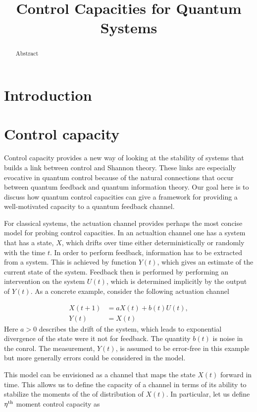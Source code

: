\documentclass[superscriptaddress,aps,pra,nofootinbib,onecolumn,notitlepage,10pt]{revtex4-1}
\begin{document}
\title{Control Capacities for Quantum Systems}
\begin{abstract}
Abstract
\end{abstract}
\maketitle
\section{Introduction}
\section{Control capacity}
Control capacity provides a new way of looking at the stability of systems that builds a link between control and Shannon theory.  These links are especially evocative in quantum control because of the natural connections that occur between quantum feedback and quantum information theory.  Our goal here is to discuss how quantum control capacities can give a framework for providing a well-motivated capacity to a quantum feedback channel.

For classical systems, the actuation channel provides perhaps the most concise model for probing control capacities.  In an actualtion channel one has a system that has a state, $X$, which drifts over time either deterministically or randomly with the time $t$.  In order to perform feedback, information has to be extracted from a system.  This is achieved by function $Y(t)$, which gives an estimate of the current state of the system.  Feedback then is performed by performing an intervention on the system $U(t)$, which is determined implicitly by the output of $Y(t)$.  As a concrete example, consider the following actuation channel

\begin{align}
X(t+1) &= aX(t) + b(t)U(t),\nonumber\\
Y(t) &= X(t)
\end{align}
Here $a>0$ describes the drift of the system, which leads to exponential divergence of the state were it not for feedback.  The quantity $b(t)$ is noise in the conrol.  The measurement, $Y(t)$, is assumed to be error-free in this example but more generally errors could be considered in the model.

This model can be envisioned as a channel that maps the state $X(t)$ forward in time.  This allows us to define the capacity of a channel in terms of its ability to stabilize the moments of the of distribution of $X(t)$.  In particular, let us define $\eta^{\rm th}$ moment control capacity as
\end{document}

